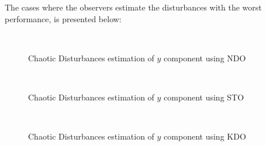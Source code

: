 \documentclass[letterpaper%
, twoside%
, 12pt%
,memoire%
, english%
,creativecommons,hyperref%
]{thETS}
\begin{document}
The cases where the observers estimate the disturbances with the worst performance, is presented below:

\begin{figure}[H]
\centering
{}
\\ \parbox{0.75\textwidth}{\caption{Chaotic Disturbances estimation of $y$ component using NDO} \label{dis_m2_est_y_ndo}}
\end{figure}

\begin{figure}[H]
\centering
{}
\\ \parbox{0.75\textwidth}{\caption{Chaotic Disturbances estimation of $y$ component using STO} \label{dis_m2_est_y_sto}}
\end{figure}

\begin{figure}[H]
\centering
{}
\\ \parbox{0.75\textwidth}{\caption{Chaotic Disturbances estimation of $y$ component using KDO} \label{dis_m2_est_y_kdo}}
\end{figure}
\end{document}
